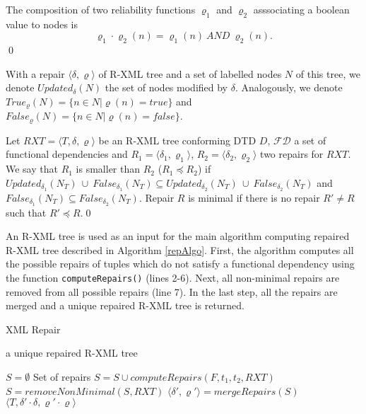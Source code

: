 \begin{define}\label{compVarrho}
The composition of two reliability functions $\varrho_1$ and $\varrho_2$ asssociating a boolean value to nodes is $$\varrho_1 \cdot \varrho_2(n) = \varrho_1(n)\ AND\ \varrho_2(n).$$\qed
\end{define}


With a repair $\langle \delta, \varrho \rangle$ of R-XML tree and a set of labelled nodes $N$ of this tree, we denote  $Updated_{\delta}(N)$ the set of nodes modified by $\delta$. Analogously, we denote $True_{\varrho}(N) = \{n \in N| \varrho(n) = true\}$ and $False_{\varrho}(N) =\{n \in N | \varrho(n) = false\}$.

\begin{define}
Let $RXT = \langle T, \delta, \varrho \rangle$ be an R-XML tree conforming DTD $D$, $\mathcal{FD}$ a set of functional dependencies and $R_1 = \langle \delta_1, \varrho_1 \rangle$, $R_2 = \langle \delta_2, \varrho_2 \rangle$ two repairs for $RXT$. We say that $R_1$ is smaller than $R_2$ ($R_1 \preceq R_2$) if $Updated_{\delta_1}(N_T)\ \cup\ False_{\delta_1}(N_T) \subseteq Updated_{\delta_2}(N_T)\ \cup\ False_{\delta_2}(N_T)$ and $False_{\delta_1}(N_T) \subseteq False_{\delta_2}(N_T)$. Repair $R$ is minimal if there is no repair $R' \neq R$ such that $R' \preceq R$.\qed
\end{define}

An R-XML tree is used as an input for the main algorithm computing repaired R-XML tree described in Algorithm \ref{repAlgo}. First, the algorithm computes all the possible repairs of tuples which do not satisfy a functional dependency using the function \texttt{computeRepairs()} (lines 2-6). Next, all non-minimal repairs are removed from all possible repairs (line 7). In the last step, all the repairs are merged and a unique repaired R-XML tree is returned.

\begin{algorithm}[H]
\caption{XML Repair}
\label{repAlgo}
\begin{algorithmic}[1]
\ENSURE a unique repaired R-XML tree

\STATE $S = \emptyset$ \COMMENT Set of repairs
		\STATE $S = S \cup computeRepairs(F, t_1, t_2, RXT)$
	\ENDFOR
\ENDFOR
\STATE $S = removeNonMinimal(S, RXT)$
\STATE $\langle \delta', \varrho' \rangle = mergeRepairs(S)$
\RETURN $\langle T, \delta' \cdot \delta, \varrho' \cdot \varrho \rangle$
\end{algorithmic}
\end{algorithm}

